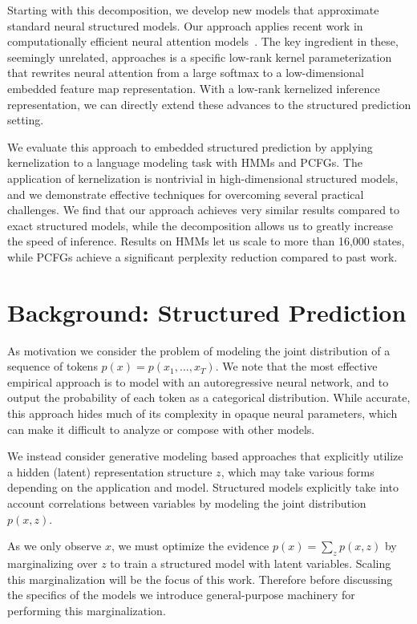 \documentclass{article}
\begin{document}
Starting with this decomposition, we develop new models that approximate
standard neural structured models. Our approach applies recent work in
computationally efficient neural attention models~\citep{peng2021rfa,choromanski2020performer}.
The key ingredient in these, seemingly unrelated, approaches is a specific
low-rank kernel parameterization that rewrites neural attention from a large
softmax to a low-dimensional embedded feature map representation.
With a low-rank kernelized
inference representation, we can directly extend these advances to the
structured prediction setting.

We evaluate this approach to embedded structured prediction by
applying kernelization to a language modeling task with HMMs and PCFGs.
The application of kernelization is
nontrivial in high-dimensional structured models, and we demonstrate
effective techniques for overcoming several practical challenges.
We find that our approach achieves
very similar results compared to exact structured models, while the
decomposition allows us to greatly increase the speed of inference.
Results on HMMs let us scale to more than 16,000 states, while PCFGs achieve 
a significant perplexity reduction compared to past work. 


\section{Background: Structured Prediction}

As motivation we consider the problem of modeling the joint distribution of
a sequence of tokens $p(x)= p(x_1, \dots, x_T)$.
We note that the most effective empirical approach is to model with an autoregressive neural network,
and to output the probability of each token as a categorical distribution.
While accurate, this approach hides much of its complexity in opaque neural parameters,
which can make it difficult to analyze or compose with other models.

We instead consider generative modeling based approaches that explicitly
utilize a hidden (latent) representation structure $z$, which may take various
forms depending on the application and model.
Structured models explicitly take into account correlations between variables by
modeling the joint distribution $p(x,z)$.

As we only observe $x$, we must optimize the evidence
$p(x) = \sum_z p(x,z)$ by marginalizing over $z$ to train a
structured model with latent variables. Scaling this marginalization
will be the focus of this work. Therefore before discussing the
specifics of the models we introduce general-purpose machinery for
performing this marginalization.
\end{document}

